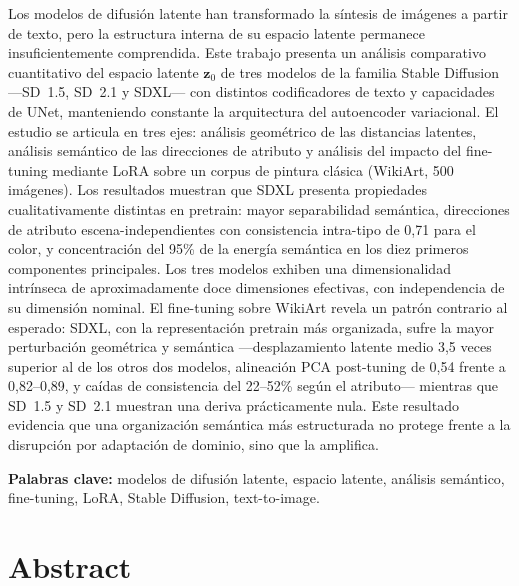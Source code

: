 \documentclass[12pt, a4paper, twoside]{book}
\newcommand{\z}{\mathbf{z}}
\begin{document}
Los modelos de difusión latente han transformado la síntesis de imágenes a partir de texto, pero la estructura interna de su espacio latente permanece insuficientemente comprendida. Este trabajo presenta un análisis comparativo cuantitativo del espacio latente $\z_0$ de tres modelos de la familia Stable Diffusion ---SD~1.5, SD~2.1 y SDXL--- con distintos codificadores de texto y capacidades de UNet, manteniendo constante la arquitectura del autoencoder variacional. El estudio se articula en tres ejes: análisis geométrico de las distancias latentes, análisis semántico de las direcciones de atributo y análisis del impacto del fine-tuning mediante LoRA sobre un corpus de pintura clásica (WikiArt, 500 imágenes). Los resultados muestran que SDXL presenta propiedades cualitativamente distintas en pretrain: mayor separabilidad semántica, direcciones de atributo escena-independientes con consistencia intra-tipo de 0,71 para el color, y concentración del 95\% de la energía semántica en los diez primeros componentes principales. Los tres modelos exhiben una dimensionalidad intrínseca de aproximadamente doce dimensiones efectivas, con independencia de su dimensión nominal. El fine-tuning sobre WikiArt revela un patrón contrario al esperado: SDXL, con la representación pretrain más organizada, sufre la mayor perturbación geométrica y semántica ---desplazamiento latente medio 3,5 veces superior al de los otros dos modelos, alineación PCA post-tuning de 0,54 frente a 0,82--0,89, y caídas de consistencia del 22--52\% según el atributo--- mientras que SD~1.5 y SD~2.1 muestran una deriva prácticamente nula. Este resultado evidencia que una organización semántica más estructurada no protege frente a la disrupción por adaptación de dominio, sino que la amplifica.

\bigskip
\noindent\textbf{Palabras clave:} modelos de difusión latente, espacio latente, análisis semántico, fine-tuning, LoRA, Stable Diffusion, text-to-image.

\chapter*{Abstract}
\end{document}
